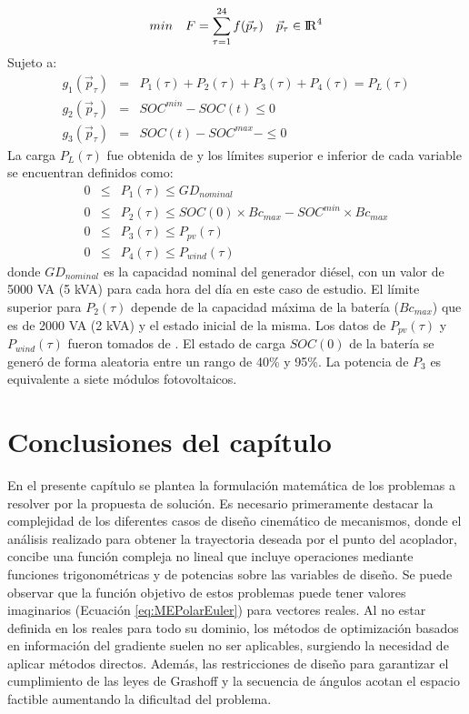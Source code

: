 \begin{equation}\label{eq:MR-FO3}
 min\quad  F=
 \sum_{\tau=1}^{24}f(\vec{p}_\tau) \quad \vec{p}_\tau \in {\rm I\!R}^{4}
 \end{equation}
 Sujeto a:
\begin{eqnarray}\label{eq:Restricciones MR}
g_1(\vec{p}_\tau)&=&P_1(\tau)+P_2(\tau)+P_3(\tau)+P_4(\tau)=P_L(\tau)\\
g_2(\vec{p}_\tau)&=&SOC^{min}-SOC(t)\leq 0 \\
g_3(\vec{p}_\tau)&=&SOC(t)-SOC^{max}-\leq 0 
\end{eqnarray}
La carga $P_L(\tau)$ fue obtenida de \cite{tazvinga2014energy} y los límites superior e inferior de cada variable se encuentran definidos como:
\begin{eqnarray}\label{eq:Restricciones MR3}
0  & \leq & P_1(\tau)   \leq  GD_{nominal} \\
0  & \leq & P_2(\tau)   \leq  SOC(0) \times Bc_{max}-  SOC^{min} \times  Bc_{max}\\
0  & \leq & P_3(\tau)   \leq  P_{pv}( \tau) \\
0  & \leq & P_4(\tau)   \leq  P_{wind}(\tau )  \label{eq:ultima restriccion MR}
\end{eqnarray}
donde $GD_{nominal}$ es la capacidad nominal del generador diésel, con un valor de 5000 VA (5 kVA) para cada hora del día en este caso de estudio. El límite superior para $ P_2(\tau)$ depende de la capacidad máxima de la batería ($Bc_{max}$) que es de 2000 VA (2 kVA) y el estado inicial de la misma. Los datos de $ P_{pv}( \tau)$ y $ P_{wind}(\tau )$  fueron tomados de \cite{Ramabhotla_Economic_dispatch}. El estado de carga $SOC(0)$ de la batería se generó de forma aleatoria entre un rango de 40\% y 95\%. La potencia de $P_3$ es equivalente a siete módulos fotovoltaicos.				
	
						


\section{Conclusiones del capítulo}
En el presente capítulo se plantea la formulación matemática de los problemas a resolver por la propuesta de solución. Es necesario primeramente destacar la complejidad de los diferentes casos de diseño cinemático de mecanismos, donde el análisis realizado para obtener la trayectoria deseada por el punto del acoplador, concibe una función compleja no lineal que incluye operaciones mediante funciones trigonométricas y de potencias sobre las variables de diseño. Se puede observar que la función objetivo de estos problemas puede tener valores imaginarios (Ecuación \ref{eq:MEPolarEuler}) para vectores reales. Al no estar definida en los reales para todo su dominio, los métodos de optimización basados en información del gradiente suelen no ser aplicables, surgiendo la necesidad de aplicar métodos directos. Además, las restricciones de diseño para garantizar el cumplimiento de las leyes de Grashoff y la secuencia de ángulos acotan el espacio factible aumentando la dificultad del problema. 

